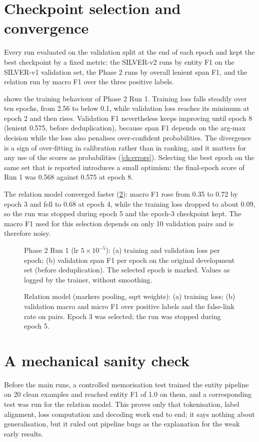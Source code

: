 \section{Checkpoint selection and convergence}
Every run evaluated on the validation split at the end of each epoch and kept the best checkpoint by a fixed metric: the SILVER-v2 runs by entity F1 on the SILVER-v1 validation set, the Phase 2 runs by overall lenient span F1, and the relation run by macro F1 over the three positive labels.

 shows the training behaviour of Phase 2 Run 1. Training loss falls steadily over ten epochs, from 2.56 to below 0.1, while validation loss reaches its minimum at epoch 2 and then rises. Validation F1 nevertheless keeps improving until epoch 8 (lenient 0.575, before deduplication), because span F1 depends on the arg-max decision while the loss also penalises over-confident probabilities. The divergence is a sign of over-fitting in calibration rather than in ranking, and it matters for any use of the scores as probabilities (\cref{ch:errors}). Selecting the best epoch on the same set that is reported introduces a small optimism: the final-epoch score of Run 1 was 0.568 against 0.575 at epoch 8.

The relation model converged faster (\cref{fig:reltraining}): macro F1 rose from 0.35 to 0.72 by epoch 3 and fell to 0.68 at epoch 4, while the training loss dropped to about 0.09, so the run was stopped during epoch 5 and the epoch-3 checkpoint kept. The macro F1 used for this selection depends on only 10  validation pairs and is therefore noisy.

\begin{figure}[t]
\centering
{}
\caption[Training and validation curves, Phase 2 Run 1]{Phase 2 Run 1 (lr $5\times10^{-5}$): (a) training and validation loss per epoch; (b) validation span F1 per epoch on the original development set (before deduplication). The selected epoch is marked. Values as logged by the trainer, without smoothing.}
\label{fig:phase2curves}
\end{figure}

\begin{figure}[t]
\centering
{}
\caption[Relation model training]{Relation model (markers pooling, sqrt weights): (a) training loss; (b) validation macro and micro F1 over positive labels and the false-link rate on  pairs. Epoch 3 was selected; the run was stopped during epoch 5.}
\label{fig:reltraining}
\end{figure}

\section{A mechanical sanity check}
Before the main runs, a controlled memorisation test trained the entity pipeline on 20 clean examples and reached entity F1 of 1.0 on them, and a corresponding test was run for the relation model. This proves only that tokenisation, label alignment, loss computation and decoding work end to end; it says nothing about generalisation, but it ruled out pipeline bugs as the explanation for the weak early results.
